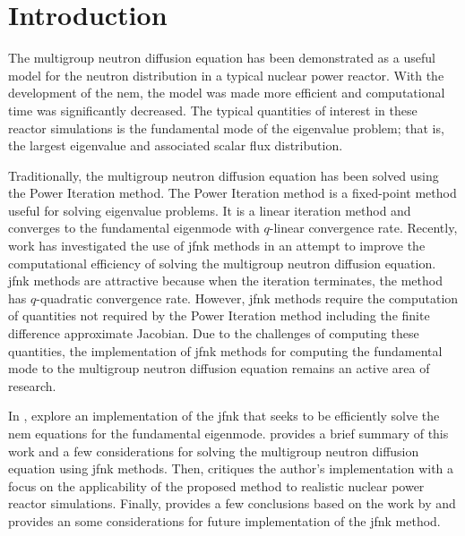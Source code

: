 \section{Introduction}
\label{sec:introduction}

The multigroup neutron diffusion equation has been demonstrated as a useful
model for the neutron distribution in a typical nuclear power reactor. With the
development of the \gls{nem}, the model was made more efficient and
computational time was significantly decreased. The typical quantities of
interest in these reactor simulations is the fundamental mode of the eigenvalue
problem; that is, the largest eigenvalue and associated scalar flux
distribution.

Traditionally, the multigroup neutron diffusion equation has been solved using
the Power Iteration method. The Power Iteration method is a fixed-point method
useful for solving eigenvalue problems. It is a linear iteration method and
converges to the fundamental eigenmode with $q$-linear convergence rate.
Recently, work has investigated the use of \gls{jfnk} methods in an attempt to
improve the computational efficiency of solving the multigroup neutron diffusion
equation. \gls{jfnk} methods are attractive because when the iteration
terminates, the method has $q$-quadratic convergence rate. However, \gls{jfnk}
methods require the computation of quantities not required by the Power
Iteration method including the finite difference approximate Jacobian. Due to
the challenges of computing these quantities, the implementation of \gls{jfnk}
methods for computing the fundamental mode to the multigroup neutron diffusion
equation remains an active area of research.

In , \citeauthor{qe2paper} explore an implementation of the
\gls{jfnk} that seeks to be efficiently solve the \gls{nem} equations for the
fundamental eigenmode.  provides a brief summary of this
work and a few considerations for solving the multigroup neutron diffusion
equation using \gls{jfnk} methods. Then,  critiques the
author's implementation with a focus on the applicability of the proposed method
to realistic nuclear power reactor simulations. Finally, 
provides a few conclusions based on the work by \citeauthor{qe2paper} and
provides an some considerations for future implementation of the \gls{jfnk}
method.
